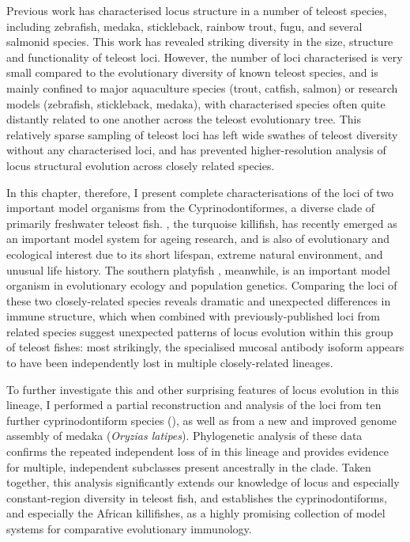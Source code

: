 Previous work has characterised \igh{} locus structure in a number of teleost species, including zebrafish, medaka, stickleback, rainbow trout, fugu, and several salmonid species. This work has revealed striking diversity in the size, structure and functionality of teleost \igh{} loci. However, the number of loci characterised is very small compared to the evolutionary diversity of known teleost species, and is mainly confined to major aquaculture species (trout, catfish, salmon) or research models (zebrafish, stickleback, medaka), with characterised species often quite distantly related to one another across the teleost evolutionary tree. This relatively sparse sampling of teleost \igh{} loci has left wide swathes of teleost diversity without any characterised \igh{} loci, and has prevented higher-resolution analysis of locus structural evolution across closely related species.

In this chapter, therefore, I present complete characterisations of the \igh{} loci of two important model organisms from the Cyprinodontiformes, a diverse clade of primarily freshwater teleost fish. \nfu, the turquoise killifish, has recently emerged as an important model system for ageing research, %
and is also of evolutionary and ecological interest due to its short lifespan, extreme natural environment, and unusual life history. The southern platyfish \xma, meanwhile, is an important model organism in evolutionary ecology and population genetics. %
Comparing the \igh{} loci of these two closely-related species reveals dramatic and unexpected differences in immune structure, which when combined with previously-published loci from related species suggest unexpected patterns of locus evolution within this group of teleost fishes: most strikingly, the specialised mucosal antibody isoform  appears to have been independently lost in multiple closely-related lineages. 

To further investigate this and other surprising features of \igh{} locus evolution in this lineage, I performed a partial reconstruction and analysis of the \igh{} loci from ten further cyprinodontiform species (), as well as from a new and improved genome assembly of medaka (\textit{Oryzias latipes}). Phylogenetic analysis of these data confirms the repeated independent loss of  in this lineage and provides evidence for multiple, independent  subclasses present ancestrally in the clade. Taken together, this analysis significantly extends our knowledge of \igh{} locus and especially constant-region diversity in teleost fish, and establishes the cyprinodontiforms, and especially the African killifishes, as a highly promising collection of model systems for comparative evolutionary immunology.

